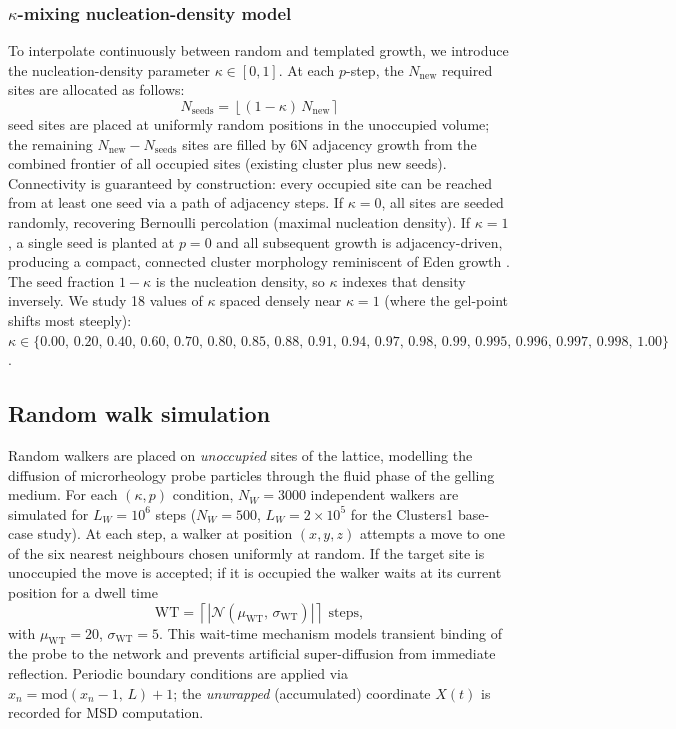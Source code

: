 \subsubsection{$\kappa$-mixing nucleation-density model}

To interpolate continuously between random and templated growth, we introduce the nucleation-density parameter $\kappa \in [0, 1]$. At each $p$-step, the $N_\mathrm{new}$ required sites are allocated as follows:
\begin{equation}
  N_\mathrm{seeds} = \left\lfloor (1-\kappa)\, N_\mathrm{new} \right\rceil
  \label{eq:nseeds}
\end{equation}
seed sites are placed at uniformly random positions in the unoccupied volume; the remaining $N_\mathrm{new} - N_\mathrm{seeds}$ sites are filled by 6N adjacency growth from the combined frontier of all occupied sites (existing cluster plus new seeds). Connectivity is guaranteed by construction: every occupied site can be reached from at least one seed via a path of adjacency steps. If $\kappa = 0$, all sites are seeded randomly, recovering Bernoulli percolation (maximal nucleation density). If $\kappa = 1$, a single seed is planted at $p = 0$ and all subsequent growth is adjacency-driven, producing a compact, connected cluster morphology reminiscent of Eden growth \citep{Eden1961}. The seed fraction $1-\kappa$ is the nucleation density, so $\kappa$ indexes that density inversely. We study 18 values of $\kappa$ spaced densely near $\kappa = 1$ (where the gel-point shifts most steeply): $\kappa \in \{0.00,\, 0.20,\, 0.40,\, 0.60,\, 0.70,\, 0.80,\, 0.85,\, 0.88,\, 0.91,\, 0.94,\, 0.97,\, 0.98,\, 0.99,\, 0.995,\, 0.996,\, 0.997,\, 0.998,\, 1.00\}$.

\subsection{Random walk simulation}

Random walkers are placed on \emph{unoccupied} sites of the lattice, modelling the diffusion of microrheology probe particles through the fluid phase of the gelling medium. For each $(\kappa, p)$ condition, $N_W = 3000$ independent walkers are simulated for $L_W = 10^6$ steps ($N_W = 500$, $L_W = 2\times 10^5$ for the Clusters1 base-case study). At each step, a walker at position $(x, y, z)$ attempts a move to one of the six nearest neighbours chosen uniformly at random. If the target site is unoccupied the move is accepted; if it is occupied the walker waits at its current position for a dwell time
\begin{equation}
  \mathrm{WT} = \left\lceil \left|\mathcal{N}(\mu_\mathrm{WT},\, \sigma_\mathrm{WT})\right| \right\rceil \text{ steps},
  \label{eq:wt}
\end{equation}
with $\mu_\mathrm{WT} = 20$, $\sigma_\mathrm{WT} = 5$. This wait-time mechanism models transient binding of the probe to the network and prevents artificial super-diffusion from immediate reflection. Periodic boundary conditions are applied via $x_n = \mathrm{mod}(x_n - 1,\, L) + 1$; the \emph{unwrapped} (accumulated) coordinate $X(t)$ is recorded for MSD computation.

